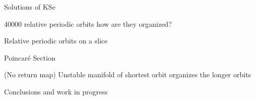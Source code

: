 \begin{frame}{Solutions of KSe}
 
\end{frame}

\begin{frame}{40000 relative periodic orbits}
 how are they organized?
\end{frame}

\begin{frame}{Relative periodic orbits on a slice}
 
\end{frame}

\begin{frame}{Poincar\'e Section}
 
(No return map) Unstable manifold of shortest orbit organizes the longer orbits

\end{frame}

\begin{frame}{Conclusions and work in progress}
 
 
\end{frame}





